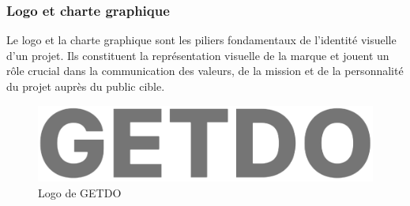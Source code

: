 \documentclass[a4paper,12pt]{report}
\begin{document}
\subsubsection{Logo et charte graphique}
Le logo et la charte graphique sont les piliers fondamentaux de l'identité visuelle d'un projet. Ils constituent la représentation visuelle de la marque et jouent un rôle crucial dans la communication des valeurs, de la mission et de la personnalité du projet auprès du public cible.

\begin{figure}[h!]
    \includegraphics[width=1\textwidth]{./images/GETDO_logo.png}
    \caption{Logo de GETDO}
    \label{fig:jira_project_task}
\end{figure}
\end{document}
